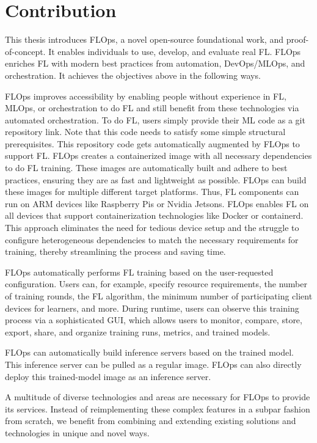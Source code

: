 
\section{Contribution}

This thesis introduces FLOps, a novel open-source foundational work, and proof-of-concept.
It enables individuals to use, develop, and evaluate real FL.
FLOps enriches FL with modern best practices from automation, DevOps/MLOps, and orchestration.
It achieves the objectives above in the following ways.

FLOps improves accessibility by enabling people without experience in
FL, MLOps, or orchestration to do FL and still benefit from these technologies via automated orchestration.
To do FL, users simply provide their ML code as a git repository link.
Note that this code needs to satisfy some simple structural prerequisites.
This repository code gets automatically augmented by FLOps to support FL.
FLOps creates a containerized image with all necessary dependencies to do FL training.
These images are automatically built and adhere to best practices, ensuring they are
as fast and lightweight as possible.
FLOps can build these images for multiple different target platforms.
Thus, FL components can run on ARM devices like Raspberry Pis or Nvidia Jetsons.
FLOps enables FL on all devices that support containerization technologies like Docker or containerd.
This approach eliminates the need for tedious device setup and the struggle to configure
heterogeneous dependencies to match the necessary requirements for training, thereby streamlining the
process and saving time.

FLOps automatically performs FL training based on the user-requested configuration.
Users can, for example, specify resource requirements, the number of training rounds, the FL algorithm,
the minimum number of participating client devices for learners, and more.
During runtime, users can observe this training process via a sophisticated GUI,
which allows users to monitor, compare, store, export, share, and organize training runs,
metrics, and trained models.

FLOps can automatically build inference servers based on the trained model.
This inference server can be pulled as a regular image.
FLOps can also directly deploy this trained-model image as an inference server.

A multitude of diverse technologies and areas are necessary
for FLOps to provide its services.
Instead of reimplementing these complex features in a subpar fashion from scratch,
we benefit from combining and extending existing solutions and technologies in unique and novel ways.

